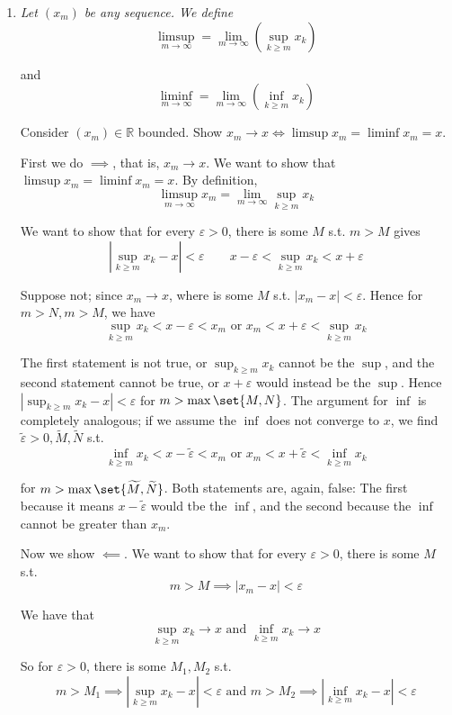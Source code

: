 \documentclass{article}
\begin{document}
\begin{enumerate}[1.]
  \item {\itshape
    Let $(x_m)$ be any sequence. We define
    \[
      \limsup_{m \to \infty} = \lim_{m \to \infty} \left(\sup_{k \ge m} x_k\right)
    \]

    and
    \[
      \liminf_{m \to \infty} = \lim_{m \to \infty} \left(\inf_{k \ge m} x_k\right)
    \]

    Consider $(x_m) \in \mathbb{R}$ bounded. Show $x_m \to x \iff \limsup x_m = \liminf x_m = x$.}

    \solution First we do $\implies$, that is, $x_m \to x$. We want to show that $\limsup x_m = \liminf x_m = x$. By definition,
    \[
      \limsup_{m \to \infty} x_m
      =
      \lim_{m \to \infty} \sup_{k \ge m} x_k
    \]

    We want to show that for every $\varepsilon > 0$, there is some $M$ s.t. $m > M$ gives
    \[
      |\sup_{k \ge m} x_k - x| < \varepsilon
      \quad\quad
      x - \varepsilon < \sup_{k \ge m} x_k < x + \varepsilon
    \]

    Suppose not; since $x_m \to x$, where is some $M$ s.t. $|x_m - x| < \varepsilon$. Hence for $m > N, m > M$, we have
    \[
      \sup_{k \ge m} x_k < x - \varepsilon < x_m
      \text{ or }
      x_m < x + \varepsilon < \sup_{k \ge m} x_k
    \]

    The first statement is not true, or $\sup_{k \ge m} x_k$ cannot be the $\sup$, and the second statement cannot be true, or $x + \varepsilon$ would instead be the $\sup$. Hence $|\sup_{k \ge m} x_k - x| < \varepsilon$ for $m > \max\set{M, N}$. The argument for $\inf$ is completely analogous; if we assume the $\inf$ does not converge to $x$, we find $\widetilde{\varepsilon} > 0, \widetilde{M}, \widetilde{N}$ s.t.
    \[
      \inf_{k \ge m} x_k < x - \widetilde{\varepsilon} < x_m
      \text{ or }
      x_m < x + \widetilde{\varepsilon} < \inf_{k \ge m} x_k
    \]

    for $m > \max\set{\widetilde{M}, \widetilde{N}}$. Both statements are, again, false: The first because it means $x - \widetilde{\varepsilon}$ would tbe the $\inf$, and the second because the $\inf$ cannot be greater than $x_m$.

    Now we show $\impliedby$.  We want to show that for every $\varepsilon > 0$, there is some $M$ s.t.
    \[
      m > M \implies |x_m - x| < \varepsilon
    \]

    We have that
    \[
      \sup_{k \ge m} x_k \to x
      \text{ and }
      \inf_{k \ge m} x_k \to x
    \]

    So for $\varepsilon > 0$, there is some $M_1, M_2$ s.t.
    \[
      m > M_1 \implies |\sup_{k \ge m} x_k - x| < \varepsilon
      \text{ and }
      m > M_2 \implies |\inf_{k \ge m} x_k - x| < \varepsilon
    \]


\end{enumerate}
\end{document}
